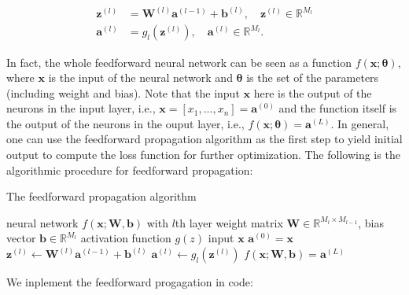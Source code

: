 \documentclass[
	parskip, 			   %
	twoside, 			   %
	DIV=14, 			   %
	BCOR=15.0mm, 		   %
	headsepline, 		   %
	open=right, 		   %
	captions=tableheading, %
	bibliography=totoc,    %
	numbers=noenddot       %
]{scrreprt}
\begin{document}
\begin{equation}
    \label{eq:input_output_neuron}
    \begin{aligned}
    \mathbf{z}^{(l)} &= \mathbf{W}^{(l)} \mathbf{a}^{(l-1)} + \mathbf{b}^{(l)}, \quad \mathbf{z}^{(l)} \in \mathbb{R}^{M_{l}}\\
    \mathbf{a}^{(l)} &= g_{l}(\mathbf{z}^{(l)}), \quad \mathbf{a}^{(l)} \in \mathbb{R}^{M_{l}}.
    \end{aligned}
\end{equation}

In fact, the whole feedforward neural network can be seen as a function $f(\mathbf{x};\mathbf{\theta})$, where $\mathbf{x}$ is the input of the neural network and $\mathbf{\theta}$ is the set of the parameters (including weight and bias). Note that the input $\mathbf{x}$ here is the output of the neurons in the input layer, i.e., $\mathbf{x}=[x_1, ..., x_n]=\mathbf{a}^{(0)}$ and the function itself is the output of the neurons in the ouput layer, i.e., $f(\mathbf{x};\mathbf{\theta})=\mathbf{a}^{(L)}$. In general, one can use the feedforward propagation algorithm as the first step to yield initial output to compute the loss function for further optimization. The following is the algorithmic procedure for feedforward propagation:

\clearpage
\begin{algorithm}[h!]
\caption{The feedforward propagation algorithm}
\label{alg:feedforward_alg}
    \begin{algorithmic}[1]
    \Require neural network $f(\mathbf{x};\mathbf{W},\mathbf{b})$ with $l$th layer
    \Require weight matrix $\mathbf{W} \in \mathbb{R}^{M_{l} \times M_{l-1}}$, bias vector $\mathbf{b} \in \mathbb{R}^{M_{l}}$
    \Require activation function $g(z)$
    \Require input $\mathbf{x}$
    \State $\mathbf{a}^{(0)}=\mathbf{x}$ 
        \State $\mathbf{z}^{(l)} \gets \mathbf{W}^{(l)} \mathbf{a}^{(l-1)} + \mathbf{b}^{(l)}$ 
        \State $\mathbf{a}^{(l)} \gets g_{l}(\mathbf{z}^{(l)})$  
        \State {}
    \EndFor
    \State \Return $f(\mathbf{x};\mathbf{W},\mathbf{b})=\mathbf{a}^{(L)}$ 
    \end{algorithmic}
\end{algorithm}

We inplement the feedforward progagation in code:
\end{document}
